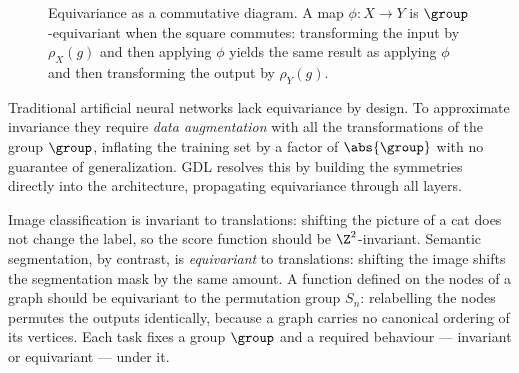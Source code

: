 \begin{figure}[h]
\centering
{}
\caption[The equivariance commutative square]{Equivariance as a commutative
diagram. A map $\phi \colon X \to Y$ is $\group$-equivariant when the square
commutes: transforming the input by $\rho_X(g)$ and then applying $\phi$ yields
the same result as applying $\phi$ and then transforming the output by
$\rho_Y(g)$.}
\label{fig:priors:equivariance}
\end{figure}

Traditional artificial neural networks lack equivariance by design. To
approximate invariance they require \emph{data augmentation} with all the
transformations of the group $\group$, inflating the training set by a factor of
$\abs{\group}$ with no guarantee of generalization. GDL resolves this by building
the symmetries directly into the architecture, propagating equivariance through
all layers.

\begin{example}
\label{ex:priors:symmetries}
Image classification is invariant to translations: shifting the picture of a cat
does not change the label, so the score function should be $\Z^2$-invariant.
Semantic segmentation, by contrast, is \emph{equivariant} to translations:
shifting the image shifts the segmentation mask by the same amount. A function
defined on the nodes of a graph should be equivariant to the permutation group
$S_n$: relabelling the nodes permutes the outputs identically, because a graph
carries no canonical ordering of its vertices. Each task fixes a group $\group$
and a required behaviour --- invariant or equivariant --- under it.
\end{example}

